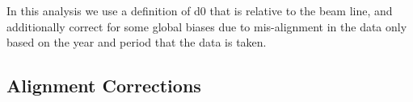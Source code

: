 
In this analysis we use a definition of d0 that is relative to the beam line, and additionally correct for some global biases due to mis-alignment in the data only based on the year and period that the data is taken.



\subsection{Alignment Corrections}
\label{sec:corrections}




